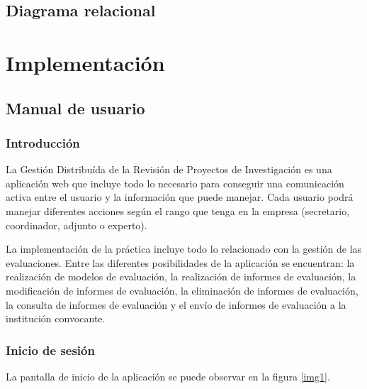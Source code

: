 \documentclass[12pt,a4paper,spanish,twoside]{book}
\begin{document}






\chapter{Diagrama relacional}

\part{Implementación}
\chapter{Manual de usuario}
\section{Introducción}
La Gestión Distribuída de la Revisión de Proyectos de Investigación es una
aplicación web que incluye todo lo necesario para conseguir una comunicación 
activa entre el usuario y la información que puede manejar. Cada usuario podrá 
manejar diferentes acciones según el rango que tenga en la empresa (secretario,
coordinador, adjunto o experto).

La implementación de la práctica incluye todo lo relacionado con la gestión de
las e\-va\-lua\-cio\-nes. Entre las diferentes posibilidades de la aplicación se
encuentran: la realización de modelos de evaluación, la realización de informes
de evaluación, la modificación de informes de evaluación, la eliminación de 
informes de evaluación, la consulta de informes de evaluación y el envío de 
informes de evaluación a la institución convocante.

\section{Inicio de sesión}
La pantalla de inicio de la aplicación se puede observar en la figura
\ref{img1}.
\end{document}
